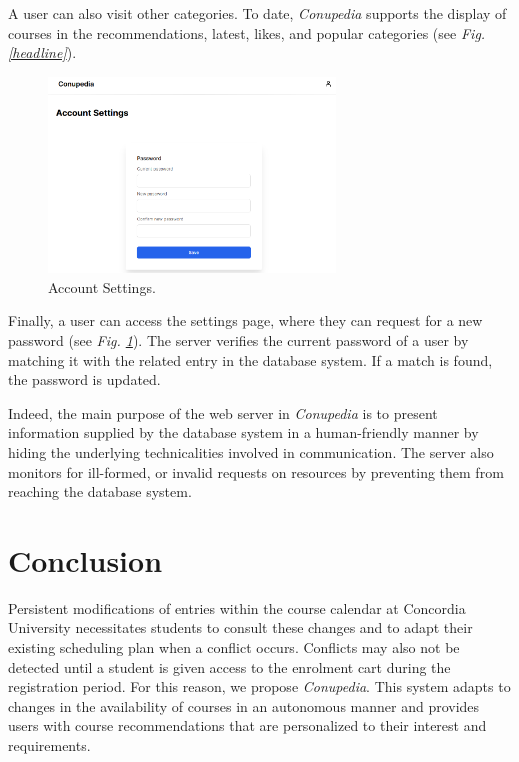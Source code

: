 \documentclass[conference]{IEEEtran}
\begin{document}
            A user can also visit other categories.
            To date, \textit{Conupedia} supports the display of courses in the recommendations, latest, likes, and popular categories (see \textit{Fig. \ref{headline}}).
            
            \begin{figure}[htbp]
            \centering
            \includegraphics[width=3.0in]{img/password.png}
            \caption{Account Settings.}
            \label{setting}
            \end{figure}
            
            Finally, a user can access the settings page, where they can request for a new password (see \textit{Fig. \ref{setting}}).
            The server verifies the current password of a user by matching it with the related entry in the database system.
            If a match is found, the password is updated.
            
            Indeed, the main purpose of the web server in \textit{Conupedia} is to present information supplied by the database system in a human-friendly manner by hiding the underlying technicalities involved in communication.
            The server also monitors for ill-formed, or invalid requests on resources by preventing them from reaching the database system.
    

\section{Conclusion}
    Persistent modifications of entries within the course calendar at Concordia University necessitates students to consult these changes and to adapt their existing scheduling plan when a conflict occurs.
    Conflicts may also not be detected until a student is given access to the enrolment cart during the registration period.
    For this reason, we propose \textit{Conupedia}.
    This system adapts to changes in the availability of courses in an autonomous manner and provides users with course recommendations that are personalized to their interest and requirements.
\end{document}
